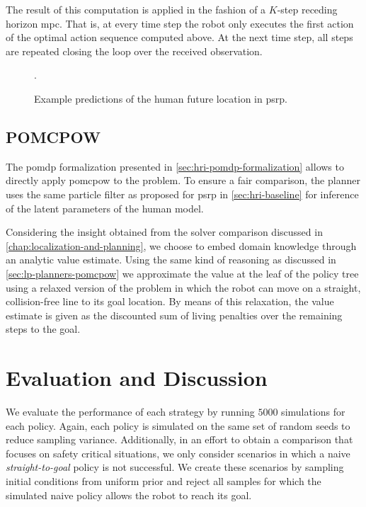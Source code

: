 The result of this computation is applied in the fashion of a $K$-step receding
horizon \ac{mpc}. That is, at every time step the robot only executes the first
action of the optimal action sequence computed above. At the next time step,
all steps are repeated closing the loop over the received observation.


\begin{figure}[htpb]
  \centering
  .
  \caption{Example predictions of the human future location in \acf{psrp}.}
  \label{fig:psrp-prediction-example}
\end{figure}

\subsection{POMCPOW}\label{sec:hri-planners}

The \ac{pomdp} formalization presented in \cref{sec:hri-pomdp-formalization}
allows to directly apply \ac{pomcpow} to the problem. To ensure a fair
comparison, the planner uses the same particle filter as proposed for \ac{psrp}
in \cref{sec:hri-baseline} for inference of the latent parameters of the human model.

Considering the insight obtained from the solver comparison discussed in
\cref{chap:localization-and-planning}, we choose to embed domain knowledge
through an analytic value estimate. Using the same kind of reasoning as
discussed in \cref{sec:lp-planners-pomcpow} we approximate the value at the
leaf of the policy tree using a relaxed version of the problem in which the
robot can move on a straight, collision-free line to its goal location. By
means of this relaxation, the value estimate is given as the discounted sum of
living penalties over the remaining steps to the goal.

\section{Evaluation and Discussion}\label{sec:hri-evaluation}

We evaluate the performance of each strategy by running $5000$ simulations for
each policy. Again, each policy is simulated on the same set of random seeds to
reduce sampling variance. Additionally, in an effort to obtain a comparison
that focuses on safety critical situations, we only consider scenarios in which
a naive \emph{straight-to-goal} policy is not successful. We create these
scenarios by sampling initial conditions from uniform prior and reject all
samples for which the simulated naive policy allows the robot to reach its goal.

